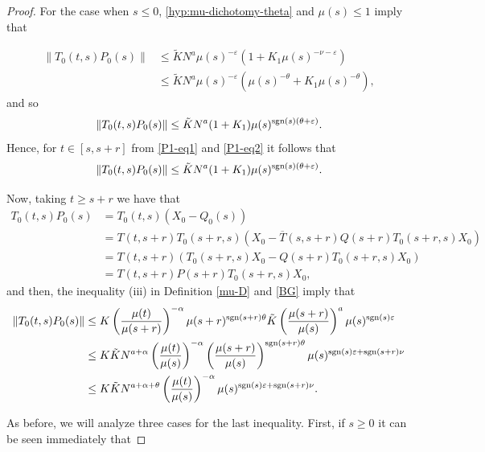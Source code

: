 \documentclass[9pt]{amsart}
\numberwithin{equation}{section}
\numberwithin{lemma}{section}
\begin{document}
\begin{proof}
    For the case when $s\leq 0$, \eqref{hyp:mu-dichotomy-theta} and $\mu(s)\leq1$ imply that

    \begin{align*}
        \|T_0(t,s)P_0(s)\| &\leq \tilde{K}N^{a}\mu(s)^{-\varepsilon}(1+K_1\mu(s)^{-\nu-\varepsilon})\\
        &\leq \tilde{K}N^{a}\mu(s)^{-\varepsilon}(\mu(s)^{-\theta}+K_1\mu(s)^{-\theta}),
    \end{align*}
    and so
    \begin{equation}\label{P1-eq2}
        \|T_0(t,s)P_0(s)\| \leq \tilde{K}N^{a}(1+K_1)\mu(s)^{\textnormal{sgn}(s)(\theta+\varepsilon)}.
    \end{equation}
    Hence, for $t\in[s,s+r]$ from \eqref{P1-eq1} and \eqref{P1-eq2}  it follows that
    \begin{equation}\label{P1-eq3}
        \|T_0(t,s)P_0(s)\| \leq \tilde{K}N^{a}(1+K_1)\mu(s)^{\textnormal{sgn}(s)(\theta+\varepsilon)}.
    \end{equation}

    Now, taking $t\geq s+r$ we have that
    \begin{align*}
        T_0(t,s)P_0(s) &= T_0(t,s)(X_0-Q_0(s))\\
        &= T(t,s+r)T_0(s+r,s)(X_0-\overline{T}(s,s+r)Q(s+r)T_0(s+r,s)X_0)\\
        &= T(t,s+r)(T_0(s+r,s)X_0-Q(s+r)T_0(s+r,s)X_0)\\
        &=T(t,s+r)P(s+r)T_0(s+r,s)X_0,
    \end{align*}
    and then, the inequality (iii) in Definition \ref{mu-D} and \eqref{BG} imply that
    \begin{align*}
        \|T_0(t,s)P_0(s)\| &\leq K\left(\frac{\mu(t)}{\mu(s+r)}\right)^{-\alpha}\mu(s+r)^{\textnormal{sgn}(s+r)\theta}\tilde{K}\left(\frac{\mu(s+r)}{\mu(s)}\right)^{a}\mu(s)^{\textnormal{sgn}(s)\varepsilon}\\
        &\leq K\tilde{K}N^{a+\alpha}\left(\frac{\mu(t)}{\mu(s)}\right)^{-\alpha}\left(\frac{\mu(s+r)}{\mu(s)}\right)^{\textnormal{sgn}(s+r)\theta}\mu(s)^{\textnormal{sgn}(s)\varepsilon+\textnormal{sgn}(s+r)\nu}\\
        &\leq K\tilde{K}N^{a+\alpha+\theta}\left(\frac{\mu(t)}{\mu(s)}\right)^{-\alpha}\mu(s)^{\textnormal{sgn}(s)\varepsilon+\textnormal{sgn}(s+r)\nu}.
    \end{align*}

    As before, we will analyze three cases for the last inequality. First, if $s\geq0$ it can be seen immediately that


\end{proof}
\end{document}
